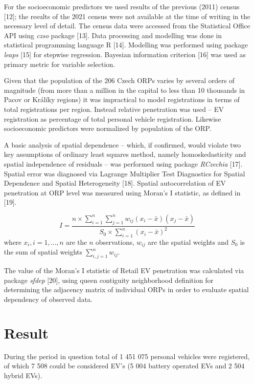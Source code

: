 \documentclass{mmeproc}
\begin{document}
For the socioeconomic predictors we used results of the previous (2011)
census {[}12{]}; the results of the 2021 census were not available at
the time of writing in the necessary level of detail. The census data
were accessed from the Statistical Office API using \emph{czso} package
{[}13{]}. Data processing and modelling was done in statistical
programming language R {[}14{]}. Modelling was performed using package
\emph{leaps} {[}15{]} for stepwise regression. Bayesian information
criterion {[}16{]} was used as primary metric for variable selection.

Given that the population of the 206 Czech ORPs varies by several orders
of magnitude (from more than a million in the capital to less than 10
thousands in Pacov or Králíky regions) it was impractical to model
registrations in terms of total registrations per region. Instead
relative penetration was used -- EV registration as percentage of total
personal vehicle registration. Likewise socioeconomic predictors were
normalized by population of the ORP.

A basic analysis of spatial dependence -- which, if confirmed, would
violate two key assumptions of ordinary least squares method, namely
homoskedasticity and spatial independence of residuals -- was performed
using package \emph{RCzechia} {[}17{]}. Spatial error was diagnosed via
Lagrange Multiplier Test Diagnostics for Spatial Dependence and Spatial
Heterogeneity {[}18{]}. Spatial autocorrelation of EV penetration at ORP
level was measured using Moran's I statistic, as defined in {[}19{]}.

\[
I = \frac{n \times \sum_{i=1}^n\sum_{j=1}^n w_{ij}(x_i - \bar{x})(x_j - \bar{x})}{S_0 \times \sum_{i=1}^n (x_i - \bar{x})^2} \tag{1}
\]
where \(x_i, i = 1, ..., n\) are the \(n\) observations, \(w_{ij}\)
are the spatial weights and \(S_0\) is the sum of spatial weights
\(\sum_{i, j=1}^n w_{ij}\).

The value of the Moran's I statistic of Retail EV penetration was
calculated via package \emph{sfdep} {[}20{]}, using queen contiguity
neighborhood definition for determining the adjacency matrix of
individual ORPs in order to evaluate spatial dependency of observed
data.

\hypertarget{result}{%
\section{Result}\label{result}}

During the period in question total of 1 451 075 personal vehicles were
registered, of which 7 508 could be considered EV's (5 004 battery
operated EVs and 2 504 hybrid EVs).
\end{document}
